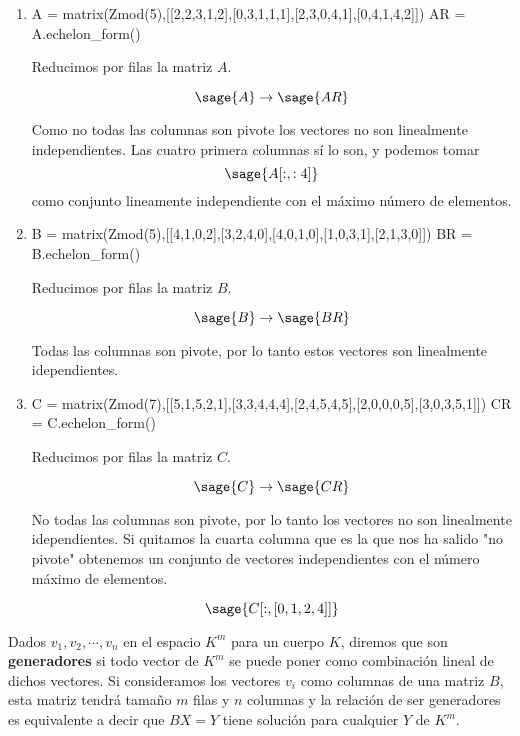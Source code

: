 \documentclass{amsart}
\begin{document}
\begin{enumerate}
\item 

\begin{sageblock}
A = matrix(Zmod(5),[[2,2,3,1,2],[0,3,1,1,1],[2,3,0,4,1],[0,4,1,4,2]])
AR = A.echelon_form()
\end{sageblock}

Reducimos por filas la matriz $A$.

$$ \sage{A} \to \sage{AR}$$

Como no todas las columnas son pivote los vectores no son linealmente
independientes. Las cuatro primera columnas sí lo son, y podemos tomar
$$ \sage{A[:,:4]}$$
como conjunto lineamente independiente con el máximo número de elementos.

\item 

\begin{sageblock}
B = matrix(Zmod(5),[[4,1,0,2],[3,2,4,0],[4,0,1,0],[1,0,3,1],[2,1,3,0]])
BR = B.echelon_form()
\end{sageblock}

Reducimos por filas la matriz $B$.

$$ \sage{B} \to \sage{BR}$$

Todas las columnas son pivote, por lo tanto estos vectores son linealmente
idependientes.

\item 
\begin{sageblock}
C = matrix(Zmod(7),[[5,1,5,2,1],[3,3,4,4,4],[2,4,5,4,5],[2,0,0,0,5],[3,0,3,5,1]])
CR = C.echelon_form()
\end{sageblock}

Reducimos por filas la matriz $C$.

$$ \sage{C} \to \sage{CR}$$

No todas las columnas son pivote, por lo tanto los vectores no son linealmente
idependientes. Si quitamos la cuarta columna que es la que nos ha salido "no
pivote" obtenemos un conjunto de vectores independientes con el número máximo
de elementos.

$$ \sage{C[:,[0,1,2,4]]}$$
\end{enumerate}


Dados $v_1, v_2, \cdots, v_n$ en el espacio $K^m$ para un cuerpo $K$, 
diremos que son {\bf generadores} si todo vector de $K^m$ se puede poner
como combinación lineal de dichos vectores. Si consideramos los vectores
$v_i$ como columnas de una matriz $B$, esta matriz tendrá tamaño $m$ filas
y $n$ columnas y la relación de ser generadores es equivalente a decir
que $BX=Y$ tiene solución para cualquier $Y$ de $K^m$. 
\end{document}

